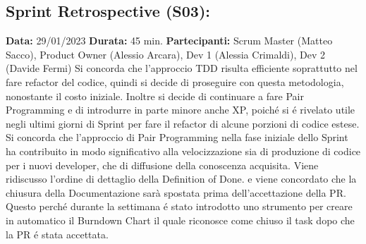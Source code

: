\begin{landscape}
        \newpage
        \subsection{Sprint Retrospective (S03):}
        \textbf{Data:} 29/01/2023
        \newline \textbf{Durata:} 45 min.
        \newline \textbf{Partecipanti:} Scrum Master (Matteo Sacco), Product Owner (Alessio Arcara), Dev 1 (Alessia Crimaldi), Dev 2 (Davide Fermi)
        \newline Si concorda che l'approccio TDD risulta efficiente soprattutto nel fare refactor del codice, quindi si decide di proseguire con questa metodologia, nonostante il costo iniziale. Inoltre si decide di continuare a fare Pair Programming e di introdurre in parte minore anche XP, poich\'e si \'e rivelato utile negli ultimi giorni di Sprint per fare il refactor di alcune porzioni di codice estese.
        \newline Si concorda che l'approccio di Pair Programming nella fase iniziale dello Sprint ha contribuito in modo significativo alla velocizzazione sia di produzione di codice per i nuovi developer, che di diffusione della conoscenza acquisita.
        \newline Viene ridiscusso l'ordine di dettaglio della Definition of Done. e viene concordato che la chiusura della Documentazione sarà spostata prima dell'accettazione della PR. Questo perch\'e durante la settimana \'e stato introdotto uno strumento per creare in automatico il Burndown Chart il quale riconosce come chiuso il task dopo che la PR \'e stata accettata.
        \newpage
            \end{landscape}

